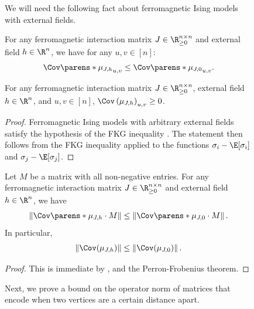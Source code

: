\documentclass[11pt,letterpaper]{article}
\begin{document}
\begin{figure}
    We will need the following fact about ferromagnetic Ising models with external fields.

    \begin{lemma}   \label{lem:cov-ferro-external}
        For any ferromagnetic interaction matrix $J\in\R_{\ge 0}^{n\times n}$ and external field $h\in\R^n$, we have for any $u,v\in[n]$:
        \[
            \Cov\parens*{\mu_{J,h}}_{u,v} \le \Cov\parens*{\mu_{J,0}}_{u,v}.
        \]
    \end{lemma}

    \begin{fact}
        \label{fact:ferro-nonneg-correlation}
        For any ferromagnetic interaction matrix $J \in \R_{\ge 0}^{n \times n}$, external field $h \in \R^n$, and $u,v \in [n]$, $\Cov\left( \mu_{J,h} \right)_{u,v} \ge 0$.
    \end{fact}
    \begin{proof}
        Ferromagnetic Ising models with arbitrary external fields satisfy the hypothesis of the FKG inequality \cite[Theorem 2.16]{gri06}.
        The statement then follows from the FKG inequality applied to the functions $\sigma_i - \E[\sigma_i]$ and $\sigma_j - \E[\sigma_j]$.
    \end{proof}

    \begin{corollary}
        \label{cor:cov-ferro-external-psd}
        Let $M$ be a matrix with all non-negative entries. For any ferromagnetic interaction matrix $J\in\R_{\ge 0}^{n\times n}$ and external field $h\in\R^n$, we have
        \[
            \left\|\Cov\parens*{\mu_{J,h}} \cdot M\right\| \le \left\|\Cov\parens*{\mu_{J,0}} \cdot M\right\|.
        \]
        In particular,
        \[ \left\|\Cov(\mu_{J,h})\right\| \le \left\|\Cov(\mu_{J,0})\right\|. \]
    \end{corollary}
    \begin{proof}
        This is immediate by , and the Perron-Frobenius theorem.
    \end{proof}

    Next, we prove a bound on the operator norm of matrices that encode when two vertices are a certain distance apart. 


\end{figure}
\end{document}
